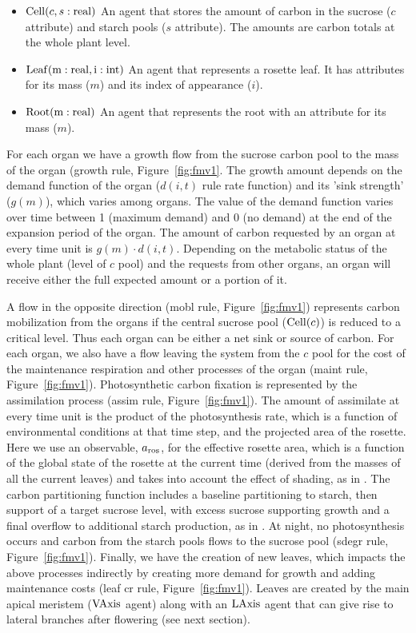 %
\begin{itemize}
\item
  \(\mathrm{Cell}(c,s:\mathrm{real})\) An agent that stores the amount of
  carbon in the sucrose (\(c\) attribute) and starch pools (\(s\)
  attribute). The amounts are carbon totals at the whole plant level.
\item
  \(\mathrm{Leaf}(\mathrm{m}:\mathrm{real},\mathrm{i}:\mathrm{int})\) An agent that represents a
  rosette leaf. It has attributes for its mass (\(m\)) and its index of
  appearance (\(i\)).
\item
  \(\mathrm{Root}(\mathrm{m}:\mathrm{real})\) An agent that represents the root with
  an attribute for its mass (\(m\)).
\end{itemize}

For each organ we have a growth flow from the sucrose carbon pool to the mass of
the organ (\textsf{growth} rule, Figure~\ref{fig:fmv1}. The growth amount
depends on the demand function of the organ (\(d(i,t)\) rule rate function) and
its 'sink strength' (\(g(m)\)), which varies among organs. The value of the
demand function varies over time between 1 (maximum demand) and 0 (no demand) at
the end of the expansion period of the organ. The amount of carbon requested by
an organ at every time unit is \(g( m ) \cdot d(i,t)\). Depending on the
metabolic status of the whole plant (level of \(c\) pool) and the requests from
other organs, an organ will receive either the full expected amount or a portion
of it.

A flow in the opposite direction (\textsf{mobl} rule, Figure~\ref{fig:fmv1})
represents carbon mobilization from the organs if the central sucrose pool
(\(\mathrm{Cell}(c)\)) is reduced to a critical level. Thus each organ can be either
a net sink or source of carbon. For each organ, we also have a flow leaving the
system from the \(c\) pool for the cost of the maintenance respiration and other
processes of the organ (\textsf{maint} rule,
Figure~\ref{fig:fmv1}). Photosynthetic carbon fixation is represented by the
assimilation process (\textsf{assim} rule, Figure~\ref{fig:fmv1}). The amount of
assimilate at every time unit is the product of the photosynthesis rate, which
is a function of environmental conditions at that time step, and the projected
area of the rosette. Here we use an observable, \(a_{\mathrm{ros}}\), for the
effective rosette area, which is a function of the global state of the rosette
at the current time (derived from the masses of all the current leaves) and
takes into account the effect of shading, as in
\citet{christophe_model-based_2008}. The carbon partitioning function includes a
baseline partitioning to starch, then support of a target sucrose level, with
excess sucrose supporting growth and a final overflow to additional starch
production, as in \citet{rasse_leaf_2006}. At night, no photosynthesis occurs
and carbon from the starch pools flows to the sucrose pool (\textsf{sdegr} rule,
Figure~\ref{fig:fmv1}). Finally, we have the creation of new leaves, which
impacts the above processes indirectly by creating more demand for growth and
adding maintenance costs (\textsf{leaf cr} rule, Figure~\ref{fig:fmv1}). Leaves
are created by the main apical meristem (\(\mathrm{VAxis}\) agent) along with an
\(\mathrm{LAxis}\) agent that can give rise to lateral branches after flowering (see
next section).

